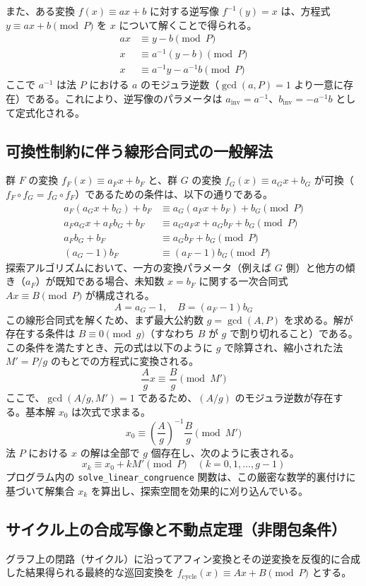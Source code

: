 \documentclass{jsarticle}
\begin{document}
また、ある変換 $f(x) \equiv a x + b$ に対する逆写像 $f^{-1}(y) = x$ は、方程式 $y \equiv a x + b \pmod P$ を $x$ について解くことで得られる。
\begin{align*}
a x &\equiv y - b \pmod P \\
x &\equiv a^{-1} (y - b) \pmod P \\
x &\equiv a^{-1} y - a^{-1} b \pmod P
\end{align*}
ここで $a^{-1}$ は法 $P$ における $a$ のモジュラ逆数（$\gcd(a, P)=1$ より一意に存在）である。これにより、逆写像のパラメータは $a_{\text{inv}} = a^{-1}$、$b_{\text{inv}} = -a^{-1} b$ として定式化される。

\subsection{可換性制約に伴う線形合同式の一般解法}
群 $F$ の変換 $f_F(x) \equiv a_F x + b_F$ と、群 $G$ の変換 $f_G(x) \equiv a_G x + b_G$ が可換（$f_F \circ f_G = f_G \circ f_F$）であるための条件は、以下の通りである。
\begin{align*}
a_F(a_G x + b_G) + b_F &\equiv a_G(a_F x + b_F) + b_G \pmod P \\
a_F a_G x + a_F b_G + b_F &\equiv a_G a_F x + a_G b_F + b_G \pmod P \\
a_F b_G + b_F &\equiv a_G b_F + b_G \pmod P \\
(a_G - 1)b_F &\equiv (a_F - 1)b_G \pmod P
\end{align*}
探索アルゴリズムにおいて、一方の変換パラメータ（例えば $G$ 側）と他方の傾き（$a_F$）が既知である場合、未知数 $x = b_F$ に関する一次合同式 $A x \equiv B \pmod P$ が構成される。
\[
A = a_G - 1, \quad B = (a_F - 1)b_G
\]
この線形合同式を解くため、まず最大公約数 $g = \gcd(A, P)$ を求める。解が存在する条件は $B \equiv 0 \pmod g$（すなわち $B$ が $g$ で割り切れること）である。この条件を満たすとき、元の式は以下のように $g$ で除算され、縮小された法 $M' = P/g$ のもとでの方程式に変換される。
\[
\frac{A}{g} x \equiv \frac{B}{g} \pmod{M'}
\]
ここで、$\gcd(A/g, M') = 1$ であるため、$(A/g)$ のモジュラ逆数が存在する。基本解 $x_0$ は次式で求まる。
\[
x_0 \equiv \left(\frac{A}{g}\right)^{-1} \frac{B}{g} \pmod{M'}
\]
法 $P$ における $x$ の解は全部で $g$ 個存在し、次のように表される。
\[
x_k \equiv x_0 + k M' \pmod P \quad (k = 0, 1, \dots, g-1)
\]
プログラム内の \texttt{solve\_linear\_congruence} 関数は、この厳密な数学的裏付けに基づいて解集合 $x_k$ を算出し、探索空間を効果的に刈り込んでいる。

\subsection{サイクル上の合成写像と不動点定理（非閉包条件）}
グラフ上の閉路（サイクル）に沿ってアフィン変換とその逆変換を反復的に合成した結果得られる最終的な巡回変換を $f_{\text{cycle}}(x) \equiv A x + B \pmod P$ とする。
\end{document}
